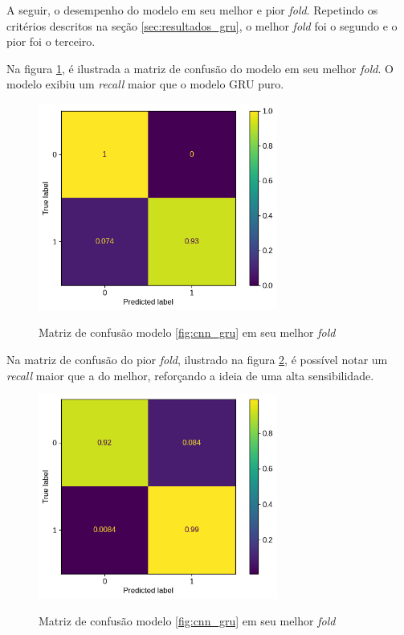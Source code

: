 A seguir, o desempenho do modelo em seu melhor e pior \textit{fold}. Repetindo os critérios descritos na seção \ref{sec:resultados_gru}, o melhor
\textit{fold} foi o segundo e o pior foi o terceiro.

Na figura \ref{fig:matriz_confusao_cnn_gru_melhor_fold}, é ilustrada a matriz de confusão do modelo em seu melhor \textit{fold}. O modelo
exibiu um \textit{recall} maior que o modelo GRU puro.

\begin{figure}[H]
  \centering
  \caption{Matriz de confusão modelo \ref{fig:cnn_gru} em seu melhor \textit{fold}}
   \includegraphics[width=0.7\textwidth]{figuras/modelos_resultados/gru_cnn/matriz_confusao_melhor_fold_gru_cnn_1.png} 
  \label{fig:matriz_confusao_cnn_gru_melhor_fold}
\end{figure}

Na matriz de confusão do pior \textit{fold}, ilustrado na figura \ref{fig:matriz_confusao_cnn_gru_pior_fold}, é possível 
notar um \textit{recall} maior que a do melhor, reforçando a ideia de uma alta sensibilidade.

\begin{figure}[H]
  \centering
  \caption{Matriz de confusão modelo \ref{fig:cnn_gru} em seu melhor \textit{fold}}
   \includegraphics[width=0.7\textwidth]{figuras/modelos_resultados/gru_cnn/matriz_confusao_pior_fold_gru_cnn_3.png} 
  \label{fig:matriz_confusao_cnn_gru_pior_fold}
\end{figure}


